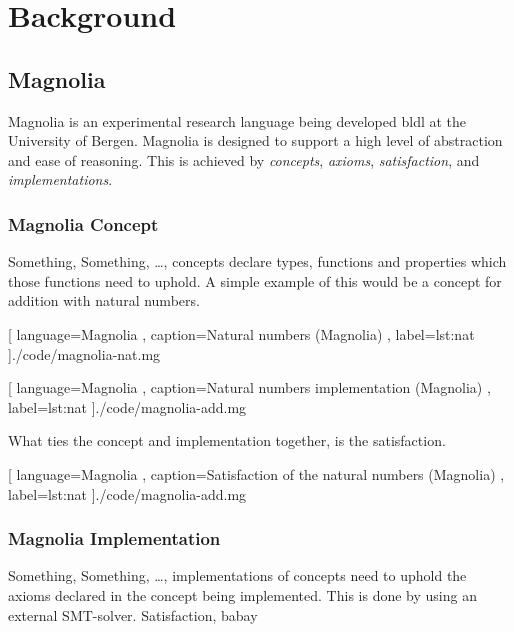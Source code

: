 \chapter{Background} \label{cha:background}

\section{Magnolia}

Magnolia is an experimental research language being developed \gls{bldl} at the
University of Bergen. Magnolia is designed to support a high level of
abstraction and ease of reasoning. This is achieved by \textit{concepts},
\textit{axioms}, \textit{satisfaction}, and \textit{implementations}.

\subsection{Magnolia Concept}

Something, Something, \dots, concepts declare types, functions and properties
which those functions need to uphold. A simple example of this would be a
concept for addition with natural numbers.

\begin{center}
  
    [ language=Magnolia
    , caption={Natural numbers (Magnolia)}
    , label=lst:nat
    ]{./code/magnolia-nat.mg}
\end{center}

\begin{center}
  
    [ language=Magnolia
    , caption={Natural numbers implementation (Magnolia)}
    , label=lst:nat
    ]{./code/magnolia-add.mg}
\end{center}

What ties the concept and implementation together, is the satisfaction.

\begin{center}
  
    [ language=Magnolia
    , caption={Satisfaction of the natural numbers (Magnolia)}
    , label=lst:nat
    ]{./code/magnolia-add.mg}
\end{center}

\subsection{Magnolia Implementation}

Something, Something, \dots, implementations of concepts need to uphold the
axioms declared in the concept being implemented. This is done by using an
external SMT-solver. Satisfaction, babay

